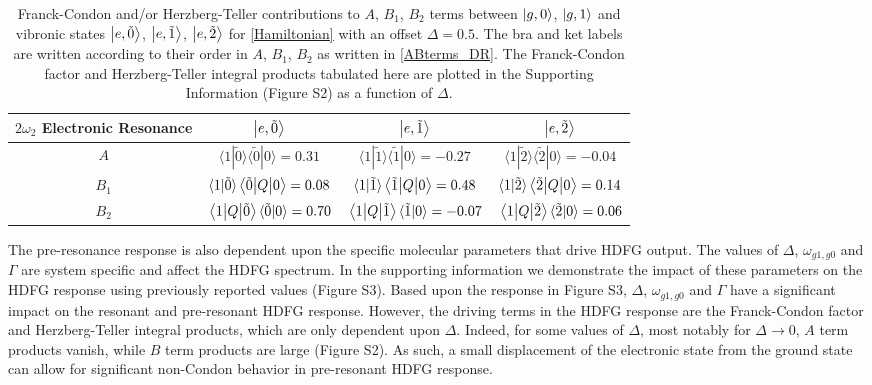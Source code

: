 \documentclass[aip, jcp, reprint, onecolumn, nofootinbib]{revtex4-2}
\begin{document}
\begin{table}[!htbp]
	\caption{\label{T:contributions} Franck-Condon and/or Herzberg-Teller contributions to $A$, $B_1$, $B_2$ terms between $\ket{g,0}$, $\ket{g,1}$ and vibronic states $\ket{e,\tilde{0}}$, $\ket{e,\tilde{1}}$, $\ket{e,\tilde{2}}$ for \autoref{Hamiltonian} with an offset $\Delta = 0.5$.
	The bra and ket labels are written according to their order in $A$, $B_1$, $B_2$ as written in \autoref{ABterms_DR}.
	The Franck-Condon factor and Herzberg-Teller integral products tabulated here are plotted in the Supporting Information (Figure S2) as a function of $\Delta$.}
	\begin{ruledtabular}
		\begin{tabular}{cccc}\label{fcht}
			$2\omega_2$ Electronic Resonance & $\ket{e,\tilde{0}}$ & $\ket{e,\tilde{1}}$ & $\ket{e,\tilde{2}}$\\
			\hline  
			$A$ 
			& $\langle 1 | \tilde{0} \rangle \langle \tilde{0} | 0 \rangle = 0.31 $  
			& $\langle 1 | \tilde{1} \rangle \langle \tilde{1} | 0 \rangle = -0.27 $ 
			& $\langle 1 | \tilde{2} \rangle \langle \tilde{2} | 0 \rangle = -0.04$\\
					
			$B_1$ 
			& $\langle 1 | \tilde{0} \rangle \mel{\tilde{0}}{Q}{0} = 0.08$ 
			& $\langle 1 | \tilde{1} \rangle \mel{\tilde{1}}{Q}{0} = 0.48$ 
			&$\langle 1 | \tilde{2} \rangle \mel{\tilde{2}}{Q}{0} = 0.14$\\
						
			$B_2$ 
			& $\mel{1}{Q}{\tilde{0}} \langle \tilde{0} | 0 \rangle = 0.70$  
			& $\mel{1}{Q}{\tilde{1}} \langle \tilde{1} | 0 \rangle = -0.07$ 
			& $\mel{1}{Q}{\tilde{2}} \langle \tilde{2} | 0 \rangle = 0.06$\\
		\end{tabular}
	\end{ruledtabular}
\end{table}

The pre-resonance response is also dependent upon the specific molecular parameters that drive HDFG output.
The values of $\Delta$, $\omega_{g1, g0}$ and $\Gamma$ are system specific and affect the HDFG spectrum.
In the supporting information we demonstrate the impact of these parameters on the HDFG response using previously reported values (Figure S3). \cite{Myers1982, Brennan2024}
Based upon the response in Figure S3, $\Delta$, $\omega_{g1, g0}$ and $\Gamma$ have a significant impact on the resonant and pre-resonant HDFG response.
However, the driving terms in the HDFG response are the Franck-Condon factor and Herzberg-Teller integral products, which are only dependent upon $\Delta$.
Indeed, for some values of $\Delta$, most notably for $\Delta \rightarrow 0$, $A$ term products vanish, while $B$ term products are large (Figure S2).
As such, a small displacement of the electronic state from the ground state can allow for significant non-Condon behavior in pre-resonant HDFG response.
\end{document}

